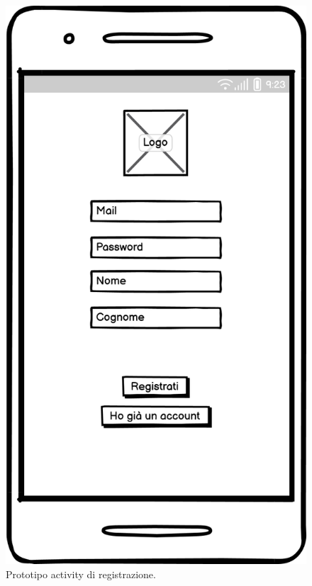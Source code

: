 \documentclass[a4paper,final,12pt]{report}
\begin{document}
\begin{figure}[hbtp]
\centering
\includegraphics[scale=0.30]{img_concettuale/RegistrazioneMobile.png}
\caption{Prototipo activity di registrazione.}
\end{figure}
\end{document}
